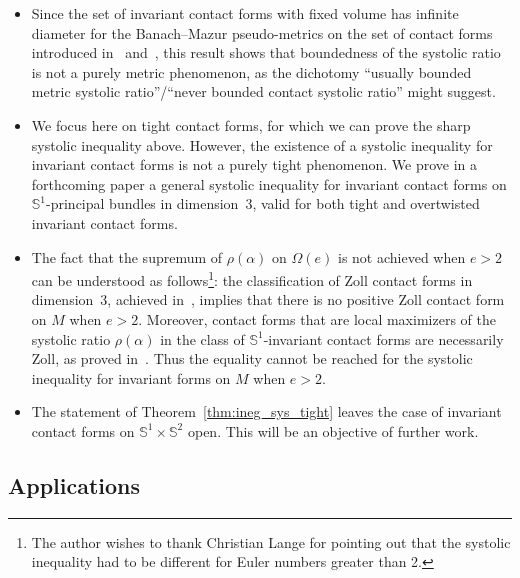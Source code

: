 \documentclass[AHL,Unicode,longabstracts]{cedram}
\newcommand{\bbS}{\mathbb{S}}
\newcommand{\bbS}{\mathbb{S}}
\begin{document}
\begin{rema}\label{remark:comments_ineg_sys}
\leavevmode
\begin{itemize}
\item Since the set of invariant contact forms with fixed volume has infinite diameter for the Banach--Mazur pseudo-metrics on the set of contact forms introduced in~\cite{RosenZhang} and~\cite{abbondandolo2023symplectic}, this result shows that boundedness of the systolic ratio is not a purely metric phenomenon, as the dichotomy ``usually bounded metric systolic ratio''/``never bounded contact systolic ratio'' might suggest.

\item We focus here on tight contact forms, for which we can prove the sharp systolic inequality above. However, the existence of a systolic inequality for invariant contact forms is not a purely tight phenomenon. We prove in a forthcoming paper a general systolic inequality for invariant contact forms on $\bbS^1$-principal bundles in dimension~3, valid for both tight and overtwisted invariant contact forms.

\item The fact that the supremum of $\rho(\alpha)$ on $\Omega(e)$ is not achieved when $e > 2$ can be understood as follows\footnote{The author wishes to thank Christian Lange for pointing out that the systolic inequality had to be different for Euler numbers greater than 2.}: the classification of Zoll contact forms in dimension~3, achieved in~\cite{benedetti_kang_2020}, implies that there is no positive Zoll contact form on $M$ when $e>2$. Moreover, contact forms that are local maximizers of the systolic ratio $\rho(\alpha)$ in the class of $\bbS^1$-invariant contact forms are necessarily Zoll, as proved in~\cite[Theorem~3.4]{paiva_2014_contact}. Thus the equality cannot be reached for the systolic inequality for invariant forms on $M$ when $e > 2$.

\item The statement of Theorem~\ref{thm:ineg_sys_tight} leaves the case of invariant contact forms on $\bbS^1 \times \bbS^2$ open. This will be an objective of further work.
\end{itemize}
\end{rema}


\subsection{Applications}
\end{document}
